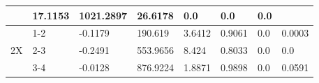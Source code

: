 \begin{table}[H]
\begin{longtable}{|p{}|p{}|p{}|p{}|p{}|p{}|p{}|p{}|}
 & 17.1153 & 1021.2897 & 26.6178 & 0.0 & 0.0 & 0.0 \\

\hline 
 \multirow{3}{*}{2X} & %
1-2

 & -0.1179 & 190.619 & 3.6412 & 0.9061 & 0.0 & 0.0003 \\
\cline{2-8} 
   & 
2-3

 & -0.2491 & 553.9656 & 8.424 & 0.8033 & 0.0 & 0.0 \\
\cline{2-8} 
   & 
3-4

 & -0.0128 & 876.9224 & 1.8871 & 0.9898 & 0.0 & 0.0591 \\\hline 

\end{longtable}
        
\end{table}
